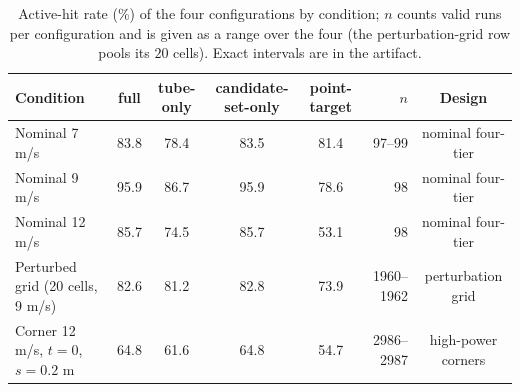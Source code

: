 \begin{table}[t]
\centering
\caption{Active-hit rate (\%) of the four configurations by condition; $n$ counts valid runs per configuration and is given as a range over the four (the perturbation-grid row pools its $20$ cells). Exact intervals are in the artifact.}
\label{tab:ablation}
\begin{tabular}{lccccrc}
\toprule
Condition & full & tube-only & candidate-set-only & point-target & $n$ & Design \\
\midrule
Nominal 7 m/s & 83.8 & 78.4 & 83.5 & 81.4 & 97--99 & nominal four-tier \\
Nominal 9 m/s & 95.9 & 86.7 & 95.9 & 78.6 & 98 & nominal four-tier \\
Nominal 12 m/s & 85.7 & 74.5 & 85.7 & 53.1 & 98 & nominal four-tier \\
Perturbed grid (20 cells, 9 m/s) & 82.6 & 81.2 & 82.8 & 73.9 & 1960--1962 & perturbation grid \\
Corner 12 m/s, $t{=}0$, $s{=}0.2$ m & 64.8 & 61.6 & 64.8 & 54.7 & 2986--2987 & high-power corners \\
\bottomrule
\end{tabular}
\end{table}
